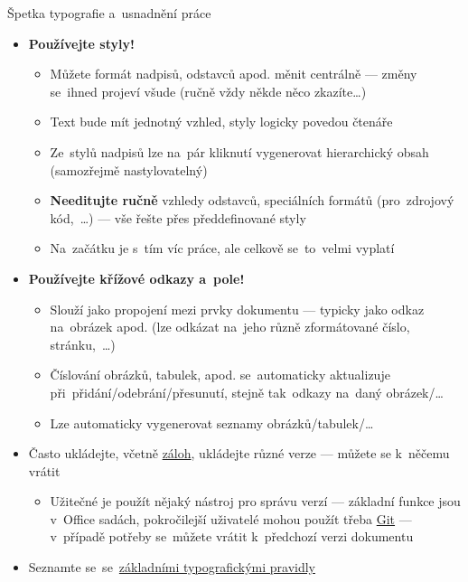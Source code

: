 \documentclass[compress, xelatex, 11pt, xcolor=svgnames, aspectratio=169,
	hyperref={
		bookmarks=true,
		unicode=true,
		colorlinks=true,
		pdftitle={Citacni software},
		plainpages=false,
		pdfauthor={Vojtech Zeisek},
		pdfsubject={Kratky uvod do citacniho software},
		pdfcreator={XeLaTeX},
		pdfkeywords={citace, reference, software, literatura},
		linkcolor=Crimson, %
		anchorcolor=Magenta, %
		citecolor=Magenta, %
		filecolor=Magenta, %
		menucolor=Magenta, %
		urlcolor=DarkTurquoise, %
		},
	url={hyphens, lowtilde} %
	]{beamer}
\begin{document}
\begin{frame}[allowframebreaks]{Špetka typografie a~usnadnění práce}
	\begin{itemize}
		\item \textbf{Používejte styly!}
			\begin{itemize}
				\item Můžete formát nadpisů, odstavců apod. měnit centrálně --- změny se~ihned projeví všude (ručně vždy někde něco zkazíte\ldots)
				\item Text bude mít jednotný vzhled, styly logicky povedou čtenáře
				\item Ze~stylů nadpisů lze na~pár kliknutí vygenerovat hierarchický obsah (samozřejmě nastylovatelný)
				\item \textbf{Needitujte ručně} vzhledy odstavců, speciálních formátů (pro~zdrojový kód,~\ldots) --- vše řešte přes předdefinované styly
				\item Na~začátku je s~tím víc práce, ale celkově se~to~velmi vyplatí
			\end{itemize}
		\item \textbf{Používejte křížové odkazy a~pole!}
			\begin{itemize}
				\item Slouží jako propojení mezi prvky dokumentu --- typicky jako odkaz na~obrázek apod. (lze odkázat na~jeho různě zformátované číslo, stránku,~\ldots)
				\item Číslování obrázků, tabulek, apod. se~automaticky aktualizuje při~přidání/odebrání/přesunutí, stejně tak~odkazy na~daný obrázek/\ldots
				\item Lze automaticky vygenerovat seznamy obrázků/tabulek/\ldots
			\end{itemize}
		\item Často ukládejte, včetně \href{https://www.natur.cuni.cz/biologie/botanika/provozni-informace/servery-weby-a-pocitace/moznosti-zalohovani-dat}{záloh}, ukládejte různé verze --- můžete se k~něčemu vrátit
		\begin{itemize}
			\item Užitečné je použít nějaký nástroj pro správu verzí --- základní funkce jsou v~Office sadách, pokročilejší uživatelé mohou použít třeba \href{https://git-scm.com/book/cs/v2}{Git} --- v~případě potřeby se~můžete vrátit k~předchozí verzi dokumentu
		\end{itemize}
		\item Seznamte se~se~\href{https://duckduckgo.com/?q=typografick\%C3\%A1+pravidla&ia=web}{základními typografickými pravidly}

\end{itemize}
\end{frame}
\end{document}
